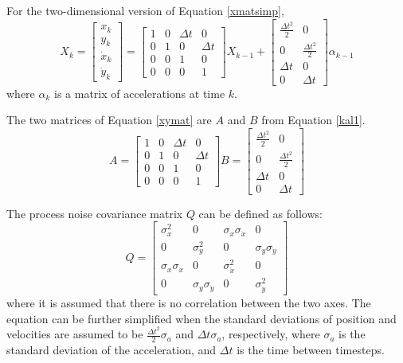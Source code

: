 For the two-dimensional version of Equation \ref{xmatsimp},
\begin{equation} \label{xymat}
X_k = 
\begin{bmatrix} 
x_k \\ 
y_k \\ 
\Dot{x}_k \\ 
\Dot{y}_k
\end{bmatrix} 
= 
\begin{bmatrix}
    1 & 0 & \Delta t & 0 \\
    0 & 1 & 0 & \Delta t \\
    0 & 0 & 1 & 0 \\
    0 & 0 & 0 & 1
\end{bmatrix}
X_{k-1}
+
\begin{bmatrix}
    \frac{\Delta t^2}{2} & 0 \\
    0 & \frac{\Delta t^2}{2} \\
    \Delta t & 0 \\
    0 & \Delta t
\end{bmatrix}
\alpha _{k-1}
\end{equation}
where \(\alpha_{k}\) is a matrix of accelerations at time \(k\).

The two matrices of Equation \ref{xymat} are \(A\) and \(B\) from Equation \ref{kal1}.
\begin{equation}
    A = \begin{bmatrix}
        1 & 0 & \Delta t & 0 \\
        0 & 1 & 0 & \Delta t \\
        0 & 0 & 1 & 0 \\
        0 & 0 & 0 & 1
    \end{bmatrix}
    B = \begin{bmatrix}
        \frac{\Delta t^2}{2} & 0 \\
        0 & \frac{\Delta t^2}{2} \\
        \Delta t & 0 \\
        0 & \Delta t
    \end{bmatrix}
\end{equation}

The process noise covariance matrix \(Q\) can be defined as follows:
\begin{equation} \label{covQ}
Q = 
\begin{bmatrix}
    \sigma ^2_x & 0 & \sigma_x \sigma_{\Dot{x}} & 0 \\
    0 & \sigma ^2_y & 0 & \sigma_y \sigma_{\Dot{y}} \\
    \sigma_x \sigma_{\Dot{x}} & 0 & \sigma ^2_{\Dot{x}} & 0 \\
    0 & \sigma_y \sigma_{\Dot{y}} & 0 & \sigma ^2_{\Dot{y}}
\end{bmatrix}
\end{equation}
where it is assumed that there is no correlation between the two axes. 
The equation can be further simplified when the standard deviations of position and velocities are assumed to be \(\frac{\Delta t^2}{2}\sigma_a\) and \(\Delta t \sigma_a\), respectively, where \(\sigma_a\) is the standard deviation of the acceleration, and \(\Delta t\) is the time between timesteps. 

